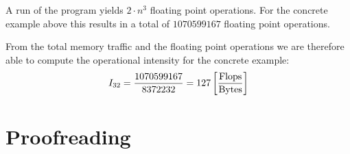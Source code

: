\documentclass[portrait,a4paper]{article}
\begin{document}
A run of the program yields $2\cdot n^3$ floating point operations. For the concrete example above this results in a total of $1070599167$ floating point operations. 

From the total memory traffic and the floating point operations we are therefore able to compute the operational intensity for the concrete example:
\begin{align*}
    I_{32} = {1070599167\over 8372232} = 127 \left[{\text{Flops} \over \text{Bytes}}\right]
\end{align*}

\section{Proofreading}
\end{document}
